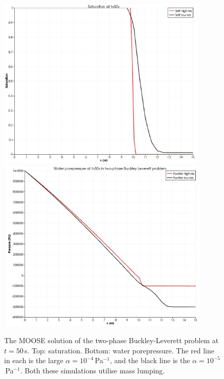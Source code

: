\documentclass[]{scrreprt}
\begin{document}
\begin{figure}[htb]
\begin{center}
\includegraphics[width=10cm]{bl2_seff.eps} \\
$\mbox{}$
\includegraphics[width=10cm]{bl2_p.eps} \\
\caption{The MOOSE solution of the two-phase Buckley-Leverett problem at
  $t=50$\,s.  Top: saturation.  Bottom: water porepressure.  The red line in
  each is the large $\alpha=10^{-4}$\,Pa$^{-1}$, and the black line is
  the $\alpha=10^{-5}$\,Pa$^{-1}$.  Both these simulations utilise
  mass lumping.}
\label{satfront2.figa}
\end{center}
\end{figure}
\end{document}
